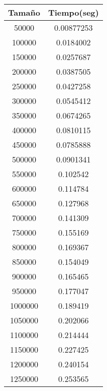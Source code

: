 \begin{longtable}{|c|c|}
\hline
\textbf{Tamaño}  & \textbf{Tiempo(seg)} \\ \hline
50000   & 0.00877253  \\ \hline
100000  & 0.0184002   \\ \hline
150000  & 0.0257687   \\ \hline
200000  & 0.0387505   \\ \hline
250000  & 0.0427258   \\ \hline
300000  & 0.0545412   \\ \hline
350000  & 0.0674265   \\ \hline
400000  & 0.0810115   \\ \hline
450000  & 0.0785888   \\ \hline
500000  & 0.0901341   \\ \hline
550000  & 0.102542    \\ \hline
600000  & 0.114784    \\ \hline
650000  & 0.127968    \\ \hline
700000  & 0.141309    \\ \hline
750000  & 0.155169    \\ \hline
800000  & 0.169367    \\ \hline
850000  & 0.154049    \\ \hline
900000  & 0.165465    \\ \hline
950000  & 0.177047    \\ \hline
1000000 & 0.189419    \\ \hline
1050000 & 0.202066    \\ \hline
1100000 & 0.214444    \\ \hline
1150000 & 0.227425    \\ \hline
1200000 & 0.240154    \\ \hline
1250000 & 0.253565    \\ \hline
\end{longtable}

